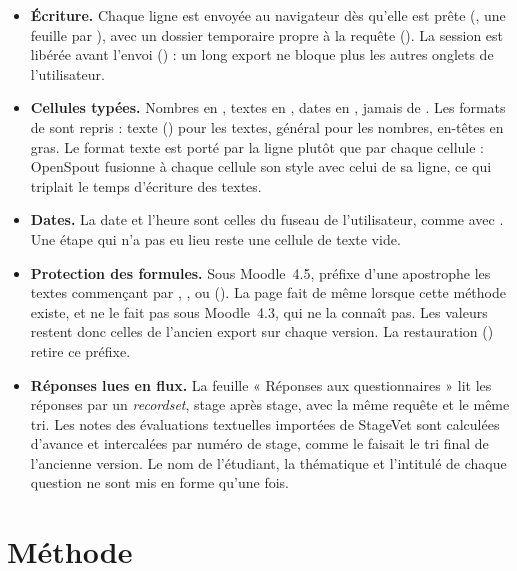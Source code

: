 \documentclass[11pt,a4paper]{article}
\begin{document}
\begin{itemize}
  \item \textbf{Écriture.} Chaque ligne est envoyée au navigateur dès qu'elle est prête
    (\code{\OpenSpout\Writer\XLSX\Writer}, une feuille par
    ), avec un dossier temporaire propre à la requête
    (). La session est libérée avant l'envoi
    () : un long export ne bloque plus les autres
    onglets de l'utilisateur.
  \item \textbf{Cellules typées.} Nombres en , textes en ,
    dates en , jamais de . Les formats de
     sont repris : texte () pour les textes, général pour les
    nombres, en-têtes en gras. Le format texte est porté par la ligne plutôt que par chaque
    cellule : OpenSpout fusionne à chaque cellule son style avec celui de sa ligne, ce qui
    triplait le temps d'écriture des textes.
  \item \textbf{Dates.} La date et l'heure sont celles du fuseau de l'utilisateur, comme avec
    . Une étape qui n'a pas eu lieu reste une cellule de texte vide.
  \item \textbf{Protection des formules.} Sous Moodle~4.5,  préfixe d'une
    apostrophe les textes commençant par \code{=}, \code{+}, \code{-} ou 
    (). La page fait de même lorsque cette
    méthode existe, et ne le fait pas sous Moodle~4.3, qui ne la connaît pas. Les valeurs restent
    donc celles de l'ancien export sur chaque version. La restauration
    () retire ce préfixe.
  \item \textbf{Réponses lues en flux.} La feuille « Réponses aux questionnaires » lit les
    réponses par un \textit{recordset}, stage après stage, avec la même requête et le même tri.
    Les notes des évaluations textuelles importées de StageVet sont calculées d'avance et
    intercalées par numéro de stage, comme le faisait le tri final de l'ancienne version. Le nom
    de l'étudiant, la thématique et l'intitulé de chaque question ne sont mis en forme qu'une fois.
\end{itemize}

\section{Méthode}
\end{document}
